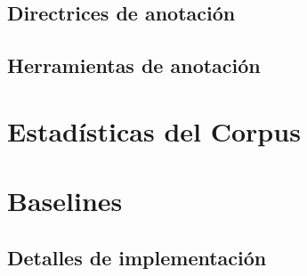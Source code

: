 \subsection{Directrices de anotaci\'on}

\subsection{Herramientas de anotaci\'on}


\section{Estad\'isticas del Corpus}


\section{Baselines}

\subsection{Detalles de implementaci\'on}

